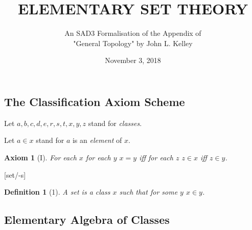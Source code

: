 \documentclass{scrartcl}
\newenvironment{forthel}{\begin{leftbar}}{\end{leftbar}}
\newtheorem*{axiom}{Axiom}
\newtheorem*{definition}{Definition}
\begin{document}
\title{ELEMENTARY SET THEORY}

\subtitle{An SAD3 Formalisation of the Appendix of \\"General Topology" 
by John L. Kelley}

\date{November 3, 2018}

\maketitle


\subsection{The Classification Axiom Scheme}

\begin{forthel}

Let $a,b,c,d,e,r,s,t,x,y,z$ stand for \emph{classes}.


Let $a \in x$ stand for $a$ is an \emph{element} of $x$.

\begin{axiom}[I]
For each $x$ for each $y$ $x = y$ iff for each $z$ 
$z \in x$ iff $z \in y$.
\end{axiom}

[set/-s]
\begin{definition}[1] A \emph{set} is a class $x$ such that for some $y$ $x \in y$.
\end{definition}

\end{forthel}

\subsection{Elementary Algebra of Classes}
\end{document}
